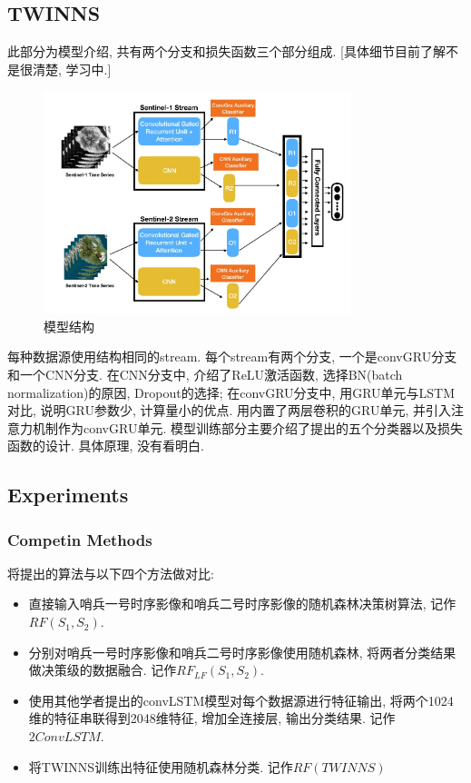 \subsection{TWINNS}
此部分为模型介绍, 共有两个分支和损失函数三个部分组成. [具体细节目前了解不是很清楚, 学习中.]
\begin{figure}[!htbp]
    \centering
    \includegraphics[width=0.8\textwidth]{pic/chap0101.jpg}
    \caption{模型结构}
    \label{fig:0101}
\end{figure}

每种数据源使用结构相同的stream. 每个stream有两个分支, 一个是convGRU分支和一个CNN分支. 在CNN分支中, 介绍了ReLU激活函数, 选择BN(batch normalization)的原因, Dropout的选择; 在convGRU分支中, 用GRU单元与LSTM对比, 说明GRU参数少, 计算量小的优点. 用内置了两层卷积的GRU单元, 并引入注意力机制作为convGRU单元. 模型训练部分主要介绍了提出的五个分类器以及损失函数的设计. 具体原理, 没有看明白.

\subsection{Experiments}
\subsubsection{Competin Methods}
将提出的算法与以下四个方法做对比:
\begin{itemize}
    \item 直接输入哨兵一号时序影像和哨兵二号时序影像的随机森林决策树算法, 记作$RF(S_{1},S_{2})$.
    \item 分别对哨兵一号时序影像和哨兵二号时序影像使用随机森林, 将两者分类结果做决策级的数据融合. 记作$RF_{LF}(S_{1},S_{2})$.
    \item 使用其他学者提出的convLSTM模型对每个数据源进行特征输出, 将两个1024维的特征串联得到2048维特征, 增加全连接层, 输出分类结果. 记作$2ConvLSTM$.
    \item 将TWINNS训练出特征使用随机森林分类. 记作$RF(TWINNS)$
\end{itemize}


